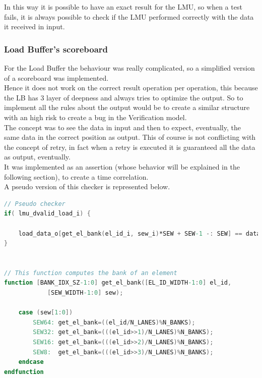 In this way it is possible to have an exact result for the LMU, so when a test fails, it is always possible to check if the LMU performed correctly with the data it received in input.\\

\subsubsection{Load Buffer's scoreboard}
For the Load Buffer the behaviour was really complicated, so a simplified  version of a scoreboard was implemented.\\

Hence it does not work on the correct result operation per operation, this because the LB has 3 layer of deepness and always tries to optimize the output. So to implement all the rules about the output would be to create a similar structure with an high risk to create a bug in the Verification model.\\

The concept was to see the data in input and then to expect, eventually, the same data in the correct position as output. This of course is not conflicting with the concept of retry, in fact when a retry is executed it is guaranteed all the data as output, eventually.\\

It was implemented as an assertion (whose behavior will be explained in the following section), to create a time correlation.\\

A pseudo version of this checker is represented below.
\bigskip

\linespread{1}

\begin{lstlisting}[language=Verilog,style=verilog-style, backgroundcolor=\color{lyel_palette}, frame=tlb]
// Pseudo checker
if( lmu_dvalid_load_i) { 

    load_data_o[get_el_bank(el_id_i, sew_i)*SEW + SEW-1 -: SEW] == data_i;
}


// This function computes the bank of an element
function [BANK_IDX_SZ-1:0] get_el_bank([EL_ID_WIDTH-1:0] el_id,
            [SEW_WIDTH-1:0] sew);
            
    case (sew[1:0])
        SEW64: get_el_bank=((el_id/N_LANES)%N_BANKS); 
        SEW32: get_el_bank=(((el_id>>1)/N_LANES)%N_BANKS); 
        SEW16: get_el_bank=(((el_id>>2)/N_LANES)%N_BANKS); 
        SEW8:  get_el_bank=(((el_id>>3)/N_LANES)%N_BANKS); 
    endcase
endfunction

\end{lstlisting}

